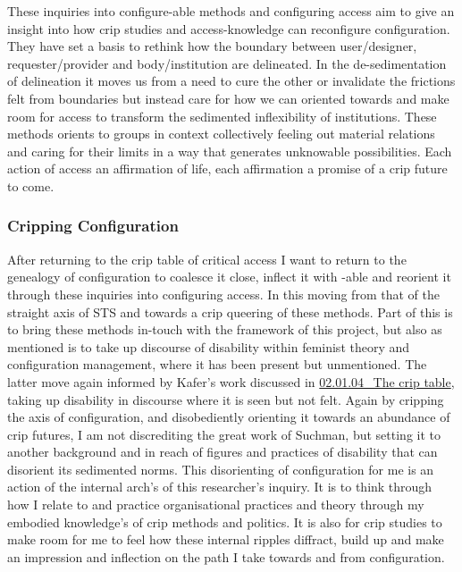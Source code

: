 These inquiries into configure-able methods and configuring access aim
to give an insight into how crip studies and access-knowledge can
reconfigure configuration. They have set a basis to rethink how the
boundary between user/designer, requester/provider and body/institution
are delineated. In the de-sedimentation of delineation it moves us from
a need to cure the other or invalidate the frictions felt from
boundaries but instead care for how we can oriented towards and make
room for access to transform the sedimented inflexibility of
institutions. These methods orients to groups in context collectively
feeling out material relations and caring for their limits in a way that
generates unknowable possibilities. Each action of access an affirmation
of life, each affirmation a promise of a crip future to come.

\hypertarget{cripping-configuration}{%
\subsubsection[Cripping
Configuration]{\texorpdfstring{\protect\hypertarget{anchor}{}{}Cripping
Configuration}{Cripping Configuration}}\label{cripping-configuration}}

After returning to the crip table of critical access I want to return to
the genealogy of configuration to coalesce it close, inflect it with
-able and reorient it through these inquiries into configuring access.
In this moving from that of the straight axis of STS and towards a crip
queering of these methods. Part of this is to bring these methods
in-touch with the framework of this project, but also as mentioned is to
take up discourse of disability within feminist theory and configuration
management, where it has been present but unmentioned. The latter move
again informed by Kafer's work discussed in
\href{../02_Crip-Tic\%20of\%20vignettes/02.01.04_The\%20crip\%20table.md}{02.01.04\_The
crip table}, taking up disability in discourse where it is seen but not
felt. Again by cripping the axis of configuration, and disobediently
orienting it towards an abundance of crip futures, I am not discrediting
the great work of Suchman, but setting it to another background and in
reach of figures and practices of disability that can disorient its
sedimented norms. This disorienting of configuration for me is an action
of the internal arch's of this researcher's inquiry. It is to think
through how I relate to and practice organisational practices and theory
through my embodied knowledge's of crip methods and politics. It is also
for crip studies to make room for me to feel how these internal ripples
diffract, build up and make an impression and inflection on the path I
take towards and from configuration.

